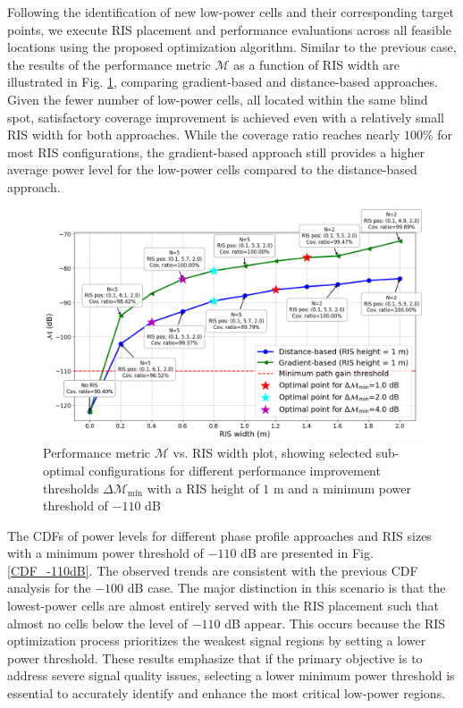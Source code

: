 \documentclass{IEEEoj}
\begin{document}
Following the identification of new low-power cells and their corresponding target points, we execute RIS placement and performance evaluations across all feasible locations using the proposed optimization algorithm. Similar to the previous case, the results of the performance metric $\mathcal{M}$ as a function of RIS width are illustrated in Fig. \ref{perf_metric_RIS_width_-110dB_multiple_curves_height_1m}, comparing gradient-based and distance-based approaches. Given the fewer number of low-power cells, all located within the same blind spot, satisfactory coverage improvement is achieved even with a relatively small RIS width for both approaches. While the coverage ratio reaches nearly $100\%$ for most RIS configurations, the gradient-based approach still provides a higher average power level for the low-power cells compared to the distance-based approach.

\begin{figure}
	\centering \includegraphics[width=\linewidth]{Sim_Results/perf_metric_RIS_width_-110dB_multiple_curves_height_1m.png}
	\caption{Performance metric $\mathcal{M}$ vs. RIS width plot, showing selected sub-optimal configurations for different performance improvement thresholds $\Delta \mathcal{M}_{\text{min}}$ with a RIS height of $1$ m and a minimum power threshold of $-110$ dB}
	\label{perf_metric_RIS_width_-110dB_multiple_curves_height_1m}
\end{figure}

The CDFs of power levels for different phase profile approaches and RIS sizes with a minimum power threshold of $-110$ dB are presented in Fig. \ref{CDF_-110dB}. The observed trends are consistent with the previous CDF analysis for the $-100$ dB case. The major distinction in this scenario is that the lowest-power cells are almost entirely served with the RIS placement such that almost no cells below the level of $-110$ dB appear. This occurs because the RIS optimization process prioritizes the weakest signal regions by setting a lower power threshold. These results emphasize that if the primary objective is to address severe signal quality issues, selecting a lower minimum power threshold is essential to accurately identify and enhance the most critical low-power regions.
\end{document}
